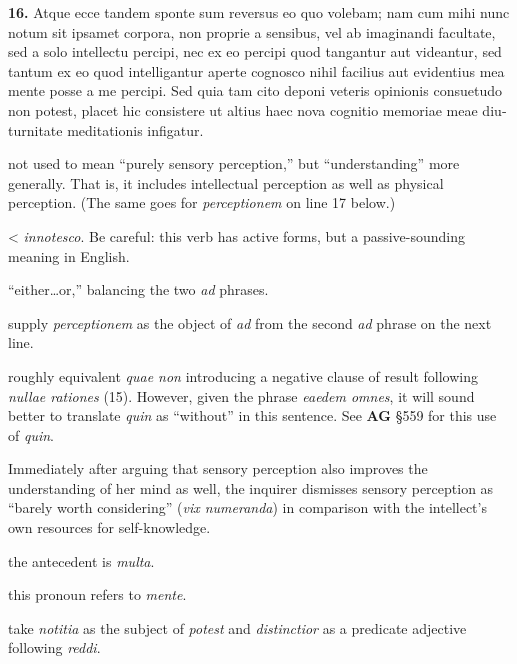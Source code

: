 \beginnumbering
\pstart
\begin{latin}
    \textenglish{\textbf{16.}} Atque ecce tandem sponte sum reversus eo quo volebam; nam cum mihi nunc notum sit ipsamet corpora, non proprie a sensibus, vel ab imaginandi facultate, sed a solo intellectu percipi, nec ex eo percipi quod tangantur aut videantur, sed tantum ex eo quod intelligantur aperte cognosco nihil facilius aut evidentius mea mente posse a me percipi. Sed quia tam cito deponi veteris opinionis consuetudo non potest, placet hic consistere ut altius haec nova cognitio memoriae meae diuturnitate meditationis infigatur.
\end{latin}
\pend
\endnumbering

\prenotes

 not used to mean ``purely sensory perception,'' but ``understanding'' more generally. That is, it includes intellectual perception as well as physical perception. (The same goes for \textit{perceptionem} on line 17 below.)

 < \textit{innotesco}. Be careful: this verb has active forms, but a passive-sounding meaning in English.

 ``either\dots or,'' balancing the two \textit{ad} phrases.

 supply \textit{perceptionem} as the object of \textit{ad} from the second \textit{ad} phrase on the next line.

 roughly equivalent \textit{quae non} introducing a negative clause of result following \textit{nullae rationes} (15). However, given the phrase \textit{eaedem omnes}, it will sound better to translate \textit{quin} as ``without'' in this sentence. See \textbf{AG} §559 for this use of \textit{quin}.

 Immediately after arguing that sensory perception also improves the understanding of her mind as well, the inquirer dismisses sensory perception as ``barely worth considering'' (\textit{vix numeranda}) in comparison with the intellect's own resources for self-knowledge.

 the antecedent is \textit{multa}.

 this pronoun refers to \textit{mente}.

 take \textit{notitia} as the subject of \textit{potest} and \textit{distinctior} as a predicate adjective following \textit{reddi}.

